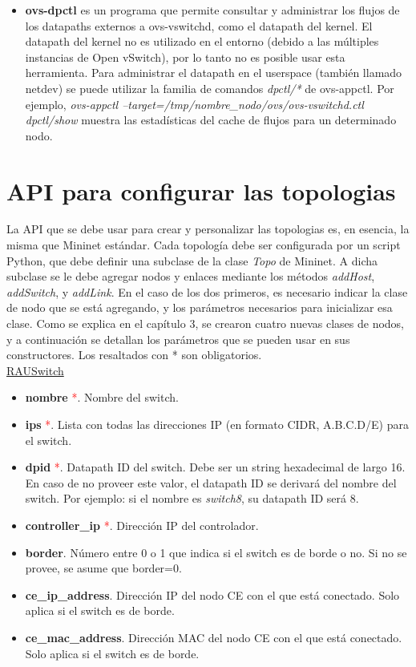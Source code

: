 \begin{itemize}
	\item \textbf{ovs-dpctl} \cite{ovs-dpctl} es un programa que permite consultar y administrar los flujos de los datapaths externos a ovs-vswitchd, como el datapath del kernel. El datapath del kernel no es utilizado en el entorno (debido a las múltiples instancias de Open vSwitch), por lo tanto no es posible usar esta herramienta. Para administrar el datapath en el userspace (también llamado netdev) se puede utilizar la familia de comandos \textit{dpctl/*} de ovs-appctl. Por ejemplo, \textit{ovs-appctl  --target=/tmp/nombre\_nodo/ovs/ovs-vswitchd.ctl dpctl/show} muestra las estadísticas del cache de flujos para un determinado nodo.
\end{itemize}

\section{API para configurar las topologias}
La API que se debe usar para crear y personalizar las topologias es, en esencia, la misma que Mininet estándar. Cada topología debe ser configurada por un script Python, que debe definir una subclase de la clase \textit{Topo} de Mininet. A dicha subclase se le debe agregar nodos y enlaces mediante los métodos \textit{addHost}, \textit{addSwitch}, y \textit{addLink}. En el caso de los dos primeros, es necesario indicar la clase de nodo que se está agregando, y los parámetros necesarios para inicializar esa clase. Como se explica en el capítulo 3, se crearon cuatro nuevas clases de nodos, y a continuación se detallan los parámetros que se pueden usar en sus constructores. Los resaltados con * son obligatorios. \\

\underline{RAUSwitch}
\begin{itemize}
	\item \textbf{nombre} \textcolor{red}{*}. Nombre del switch.
	\item \textbf{ips} \textcolor{red}{*}. Lista con todas las direcciones IP (en formato CIDR, A.B.C.D/E) para el switch.
	\item \textbf{dpid} \textcolor{red}{*}. Datapath ID del switch. Debe ser un string hexadecimal de largo 16. En caso de no proveer este valor, el datapath ID se derivará del nombre del switch. Por ejemplo: si el nombre es \textit{switch8}, su datapath ID será 8.
	\item \textbf{controller\_ip} \textcolor{red}{*}. Dirección IP del controlador.
	\item \textbf{border}. Número entre 0 o 1 que indica si el switch es de borde o no. Si no se provee, se asume que border=0.
	\item \textbf{ce\_ip\_address}. Dirección IP del nodo CE con el que está conectado. Solo aplica si el switch es de borde.
	\item \textbf{ce\_mac\_address}. Dirección MAC del nodo CE con el que está conectado. Solo aplica si el switch es de borde.
\end{itemize}

